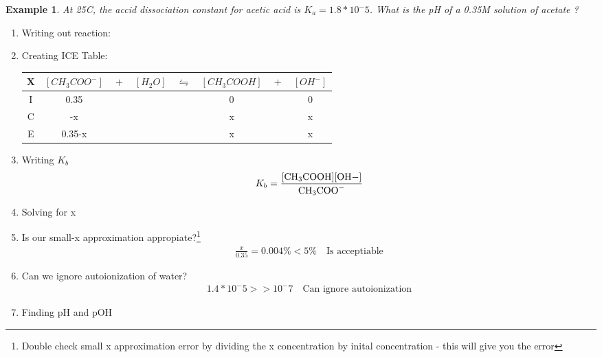 \documentclass{article}  %
\newtheorem{exmp}{Example}
\begin{document}
\begin{exmp}
    At 25C, the accid dissociation constant for acetic acid  is $K_a = 1.8*10^-5$. What is the pH of a 0.35M solution of acetate ?
\end{exmp}
\begin{enumerate}
    \item Writing out reaction:
    \item Creating ICE Table:
    \newline
    \begin{tabular}{c|c@{}c@{}c@{}c@{}c@{}c@{}c}
        \hline
        X   & $[CH_3COO^-]$ & ${}+{}$ & $[H_2O]$ & ${}\leftrightharpoons{}$ & $[CH_3COOH]$ & ${}+{}$ & $[OH^-]$ \\
        \hline
        I   &  0.35   &&     &&  0   && 0  \\
        C   &  -x    &&     &&  x   && x  \\
        E   &  0.35-x &&     &&  x   && x  \\      
    \end{tabular}
    \item Writing $K_b$
    \begin{equation*}
        \begin{aligned}
            K_b = \ce{\frac{[CH3COOH][OH-]}{CH3COO-}} %
        \end{aligned}
    \end{equation*}
    \item Solving for x
    \item Is our small-x approximation appropiate?\footnote{Double check small x approximation error by dividing the x concentration by inital concentration - this will give you the error}
    \begin{equation*}
        \begin{aligned}
            \frac{x}{0.35} = 0.004\% < 5\% \quad \text{Is acceptiable}
        \end{aligned}
    \end{equation*}
    \item Can we ignore autoionization of water?
    \begin{equation*}
        \begin{aligned}
            1.4*10^-5 >> 10^-7 \quad \text{Can ignore autoionization}
        \end{aligned}
    \end{equation*}
    \item Finding pH and pOH %
\end{enumerate}
\end{document}
